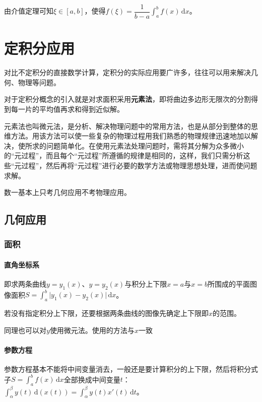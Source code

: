 \documentclass[UTF8, 12pt]{ctexart}
\begin{document}
由介值定理可知$\xi\in[a,b]$，使得$f(\xi)=\dfrac{1}{b-a}\int_a^bf(x)\,\textrm{d}x$。

\section{定积分应用}

对比不定积分的直接数学计算，定积分的实际应用要广许多，往往可以用来解决几何、物理等问题。

对于定积分概念的引入就是对求面积采用\textbf{元素法}，即将曲边多边形无限次的分割得到每一片的平均值再求和得到近似解。

元素法也叫微元法，是分析、解决物理问题中的常用方法，也是从部分到整体的思维方法。用该方法可以使一些复杂的物理过程用我们熟悉的物理规律迅速地加以解决，使所求的问题简单化。在使用元素法处理问题时，需将其分解为众多微小的“元过程”，而且每个“元过程”所遵循的规律是相同的，这样，我们只需分析这些“元过程”，然后再将“元过程”进行必要的数学方法或物理思想处理，进而使问题求解。

数一基本上只考几何应用不考物理应用。

\subsection{几何应用}

\subsubsection{面积}

\paragraph{直角坐标系} \leavevmode \medskip

即求两条曲线$y=y_1(x)$、$y=y_2(x)$与积分上下限$x=a$与$x=b$所围成的平面图像面积$S=\int_a^b\vert y_1(x)-y_2(x)\vert\,\textrm{d}x$。

若没有指定积分上下限，还要根据两条曲线的图像先确定上下限即$x$的范围。

同理也可以对$y$使用微元法。使用的方法与$x$一致

\paragraph{参数方程} \leavevmode \medskip

参数方程基本不能将中间变量消去，一般还是要计算积分的上下限，然后将积分式子$S=\int_a^bf(x)\,\textrm{d}x$全部换成中间变量$t$：$\int_\alpha^\beta y(t)\,\textrm{d}(x(t))=\int_\alpha^\beta y(t)x'(t)\,\textrm{d}t$。
\end{document}
